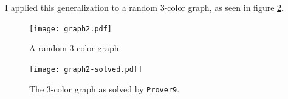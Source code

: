 \documentclass[12pt]{article}
\newcommand{\provernine}{\texttt{Prover9}\xspace}
\begin{document}
I applied this generalization to a random 3-color graph, as seen in figure \ref{fig:graph2}. \\

\noindent
\begin{minipage}[b]{\textwidth}
	\begin{minipage}[b]{0.50\textwidth}
		\begin{figure}[H]
			\begin{center}
				\texttt{[image: graph2.pdf]}
			\end{center}
			\caption{\label{fig:graph2} A random 3-color graph.}
		\end{figure}
	\end{minipage}
	\begin{minipage}[b]{0.50\textwidth}
		\begin{figure}[H]
			\begin{center}
				\texttt{[image: graph2-solved.pdf]}
			\end{center}
			\caption{\label{fig:graph2} The 3-color graph as solved by \provernine.}
		\end{figure}
	\end{minipage}
\end{minipage}
\end{document}

